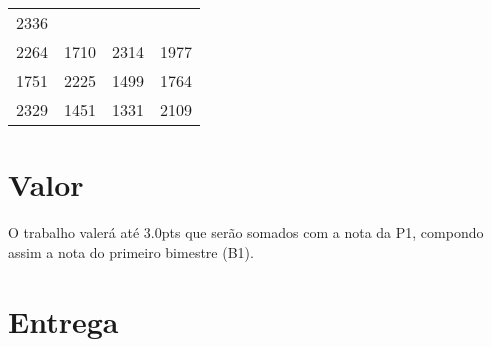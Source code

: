 \documentclass[a4paper]{article}
\begin{document}
\begin{longtable}[c]{@{}cccc@{}}
\begin{minipage}[t]{0.06\columnwidth}
2336
\strut\end{minipage}\tabularnewline
\begin{minipage}[t]{0.06\columnwidth}\centering\strut
2264
\strut\end{minipage} &
\begin{minipage}[t]{0.06\columnwidth}\centering\strut
1710
\strut\end{minipage} &
\begin{minipage}[t]{0.06\columnwidth}\centering\strut
2314
\strut\end{minipage} &
\begin{minipage}[t]{0.06\columnwidth}\centering\strut
1977
\strut\end{minipage}\tabularnewline
\begin{minipage}[t]{0.06\columnwidth}\centering\strut
1751
\strut\end{minipage} &
\begin{minipage}[t]{0.06\columnwidth}\centering\strut
2225
\strut\end{minipage} &
\begin{minipage}[t]{0.06\columnwidth}\centering\strut
1499
\strut\end{minipage} &
\begin{minipage}[t]{0.06\columnwidth}\centering\strut
1764
\strut\end{minipage}\tabularnewline
\begin{minipage}[t]{0.06\columnwidth}\centering\strut
2329
\strut\end{minipage} &
\begin{minipage}[t]{0.06\columnwidth}\centering\strut
1451
\strut\end{minipage} &
\begin{minipage}[t]{0.06\columnwidth}\centering\strut
1331
\strut\end{minipage} &
\begin{minipage}[t]{0.06\columnwidth}\centering\strut
2109
\strut\end{minipage}\tabularnewline
\bottomrule
\end{longtable}

\section{Valor}
O trabalho valerá até $3.0$pts que serão somados com a nota da P1, compondo assim a nota do primeiro bimestre (B1).

\section{Entrega}
\end{document}

